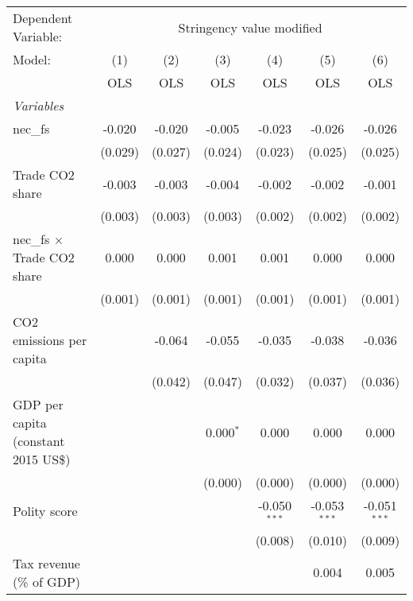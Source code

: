 
\begingroup
\centering
\begin{tabular}{lcccccc}
   \toprule
   Dependent Variable: & \multicolumn{6}{c}{Stringency value modified}\\
   Model:                               & (1)     & (2)     & (3)         & (4)            & (5)            & (6)\\  
                                        &  OLS    & OLS     & OLS         & OLS            & OLS            & OLS\\  
   \midrule
   \emph{Variables}\\
   nec\_fs                              & -0.020  & -0.020  & -0.005      & -0.023         & -0.026         & -0.026\\   
                                        & (0.029) & (0.027) & (0.024)     & (0.023)        & (0.025)        & (0.025)\\   
   Trade CO2 share                      & -0.003  & -0.003  & -0.004      & -0.002         & -0.002         & -0.001\\   
                                        & (0.003) & (0.003) & (0.003)     & (0.002)        & (0.002)        & (0.002)\\   
   nec\_fs $\times$ Trade CO2 share     & 0.000   & 0.000   & 0.001       & 0.001          & 0.000          & 0.000\\   
                                        & (0.001) & (0.001) & (0.001)     & (0.001)        & (0.001)        & (0.001)\\   
   CO2 emissions per capita             &         & -0.064  & -0.055      & -0.035         & -0.038         & -0.036\\   
                                        &         & (0.042) & (0.047)     & (0.032)        & (0.037)        & (0.036)\\   
   GDP per capita (constant 2015 US\$)  &         &         & 0.000$^{*}$ & 0.000          & 0.000          & 0.000\\   
                                        &         &         & (0.000)     & (0.000)        & (0.000)        & (0.000)\\   
   Polity score                         &         &         &             & -0.050$^{***}$ & -0.053$^{***}$ & -0.051$^{***}$\\   
                                        &         &         &             & (0.008)        & (0.010)        & (0.009)\\   
   Tax revenue (\% of GDP)              &         &         &             &                & 0.004          & 0.005\\   

\end{tabular}
